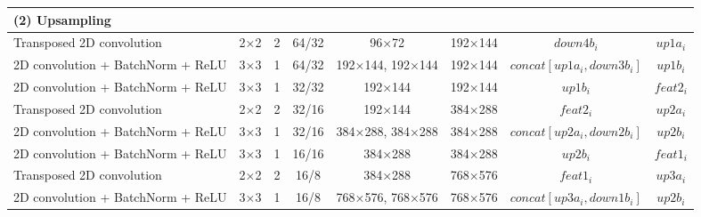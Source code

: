 \begin{table}[htbp]
\begin{adjustbox}{width=1\textwidth}
\begin{tabular}{|l|c|c|c|c|c|c|c|}
\hline
\rowcolor{bgcolor}
\textbf{(2) Upsampling} &                 &                 &                 &                 &                 &                    &                 \\ \hline
\hspace{0.75cm}Transposed 2D convolution                             & 2×2             & 2               & 64/32         & 96×72           & 192×144           & $down4b_i$              & $up1a_i$          \\ \hline
\hspace{0.75cm}2D convolution + BatchNorm + ReLU                           & 3×3             & 1               & 64/32            & 192×144, 192×144         & 192×144         & $concat[up1a_i, down3b_i]$           & $up1b_i$          \\ \hline
\hspace{0.75cm}2D convolution + BatchNorm + ReLU                           & 3×3             & 1               & 32/32            & 192×144         & 192×144         & $up1b_i$            & $feat2_i$          \\ \hline
\hspace{0.75cm}Transposed 2D convolution                             & 2×2             & 2               & 32/16         & 192×144           & 384×288           & $feat2_i$              & $up2a_i$          \\ \hline
\hspace{0.75cm}2D convolution + BatchNorm + ReLU                           & 3×3             & 1               & 32/16            & 384×288, 384×288         & 384×288         & $concat[up2a_i , down2b_i]$           & $up2b_i$          \\ \hline
\hspace{0.75cm}2D convolution + BatchNorm + ReLU                           & 3×3             & 1               & 16/16            & 384×288         & 384×288         & $up2b_i$           & $feat1_i$          \\ \hline
\hspace{0.75cm}Transposed 2D convolution                             & 2×2             & 2               & 16/8         & 384×288           & 768×576           & $feat1_i$               & $up3a_i$          \\ \hline
\hspace{0.75cm}2D convolution + BatchNorm + ReLU                           & 3×3             & 1               & 16/8            & 768×576, 768×576        & 768×576         &$concat[up3a_i, down1b_i]$           & $up2b_i$          \\ \hline

\end{tabular}
\end{adjustbox}
\end{table}

